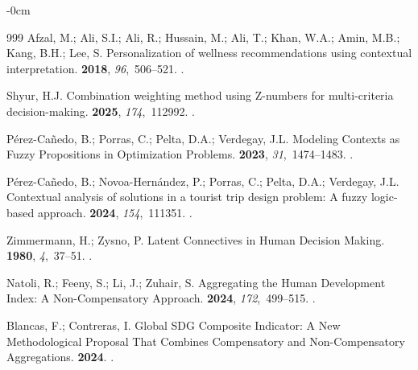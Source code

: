 \documentclass[mathematics,article,submit,moreauthors]{Definitions/mdpi}
\begin{document}
\begin{adjustwidth}{-\extralength}{0cm}
\begin{thebibliography}{999}
    Afzal, M.; Ali, S.I.; Ali, R.; Hussain, M.; Ali, T.; Khan, W.A.; Amin, M.B.;
    Kang, B.H.; Lee, S.
    \newblock Personalization of wellness recommendations using contextual
    interpretation.
     {\bf 2018}, {\em
        96},~506--521.
    .

    Shyur, H.J.
    \newblock Combination weighting method using Z-numbers for multi-criteria
    decision-making.
     {\bf 2025}, {\em 174},~112992.
    .
    
    P{\'{e}}rez-Ca{\~{n}}edo, B.; Porras, C.; Pelta, D.A.; Verdegay, J.L.
    \newblock Modeling Contexts as Fuzzy Propositions in Optimization Problems.
     {\bf 2023}, {\em
        31},~1474--1483.
    .
    
    Pérez-Cañedo, B.; Novoa-Hernández, P.; Porras, C.; Pelta, D.A.; Verdegay,
    J.L.
    \newblock Contextual analysis of solutions in a tourist trip design problem: A
    fuzzy logic-based approach.
     {\bf 2024}, {\em 154},~111351.
    .
    
    Zimmermann, H.; Zysno, P.
    \newblock Latent Connectives in Human Decision Making.
     {\bf 1980}, {\em 4},~37--51.
    .
    
    Natoli, R.; Feeny, S.; Li, J.; Zuhair, S.
    \newblock Aggregating the Human Development Index: A Non-Compensatory Approach.
     {\bf 2024}, {\em 172},~499--515.
    .
    
    Blancas, F.; Contreras, I.
    \newblock Global {SDG} Composite Indicator: A New Methodological Proposal That
    Combines Compensatory and Non-Compensatory Aggregations.
     {\bf 2024}.
    .
    

\end{thebibliography}
\end{adjustwidth}
\end{document}
